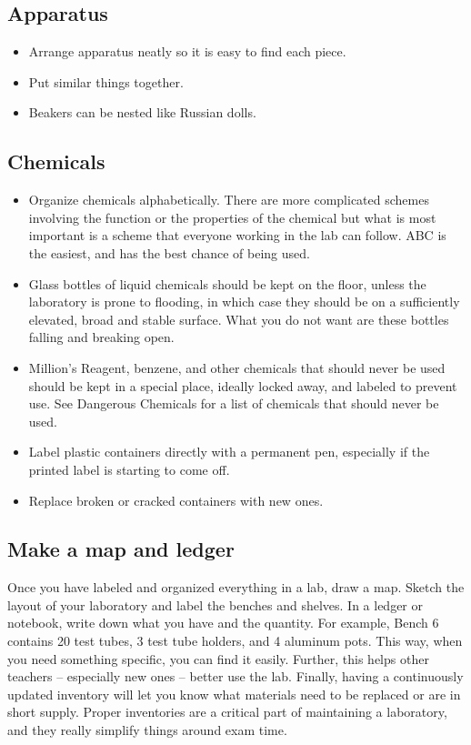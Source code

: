 \subsection{Apparatus}
\begin{itemize}
\item{Arrange apparatus neatly so it is easy to find each piece.}
\item{Put similar things together.}
\item{Beakers can be nested like Russian dolls.}
\end{itemize}

\subsection{Chemicals}
\begin{itemize}
\item{Organize chemicals alphabetically. 
There are more complicated schemes involving the function 
or the properties of the chemical but what is most important 
is a scheme that everyone working in the lab can follow. 
ABC is the easiest, 
and has the best chance of being used.}
\item{Glass bottles of liquid chemicals should be kept on the floor, 
unless the laboratory is prone to flooding, 
in which case they should be on a sufficiently elevated, 
broad and stable surface. 
What you do not want are these bottles falling and breaking open.}
\item{Million's Reagent, 
benzene, 
and other chemicals that should never be used should be kept in a special place, 
ideally locked away, 
and labeled to prevent use. 
See Dangerous Chemicals for a list of chemicals that should never be used.}
\item{Label plastic containers directly with a permanent pen, 
especially if the printed label is starting to come off.} 
\item{Replace broken or cracked containers with new ones.}
\end{itemize}

\subsection{Make a map and ledger}
Once you have labeled and organized everything in a lab, 
draw a map. 
Sketch the layout of your laboratory 
and label the benches and shelves. 
In a ledger or notebook, 
write down what you have and the quantity. 
For example, 
Bench 6 contains 20 test tubes, 
3 test tube holders, 
and 4 aluminum pots. 
This way, 
when you need something specific, 
you can find it easily. 
Further, 
this helps other teachers – especially new ones – better use the lab. 
Finally, 
having a continuously updated inventory will let you know what 
materials need to be replaced or are in short supply. 
Proper inventories are a critical part of maintaining a laboratory, 
and they really simplify things around exam time.

